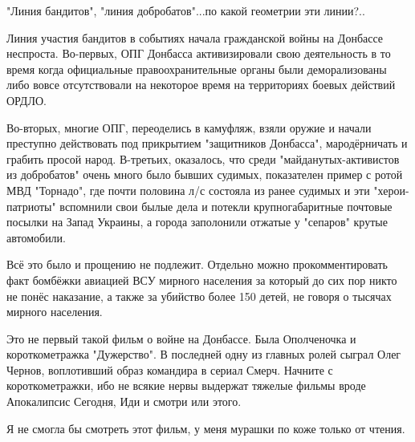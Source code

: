 \begin{itemize}
"Линия бандитов", "линия добробатов"...по какой геометрии эти линии?..


Линия участия бандитов в событиях начала гражданской войны на Донбассе
неспроста. Во-первых, ОПГ Донбасса активизировали свою деятельность в то время
когда официальные правоохранительные органы были деморализованы либо вовсе
отсутствовали на некоторое время на территориях боевых действий ОРДЛО.

Во-вторых, многие ОПГ, переоделись в камуфляж, взяли оружие и начали преступно
действовать под прикрытием "защитников Донбасса", мародёрничать и грабить
просой народ. В-третьих, оказалось, что среди "майданутых-активистов из
добробатов" очень много было бывших судимых, показателен пример с ротой МВД
"Торнадо", где почти половина л/с состояла из ранее судимых и эти
"херои-патриоты" вспомнили свои былые дела и потекли крупногабаритные почтовые
посылки на Запад Украины, а города заполонили отжатые у "сепаров" крутые
автомобили. 

Всё это было и прощению не подлежит. Отдельно можно прокомментировать факт
бомбёжки авиацией ВСУ мирного населения за который до сих пор никто не понёс
наказание, а также за убийство более 150 детей, не говоря о тысячах мирного
населения.

 

Это не первый такой фильм о войне на Донбассе. Была Ополченочка и
короткометражка "Дужерство". В последней одну из главных ролей сыграл Олег
Чернов, воплотивший образ командира в сериал Смерч. Начните с короткометражки,
ибо не всякие нервы выдержат тяжелые фильмы вроде Апокалипсис Сегодня, Иди и
смотри или этого.


 

Я не смогла бы смотреть этот фильм, у меня мурашки по коже только от чтения.

\begin{itemize}
 

\end{itemize}
\end{itemize}
